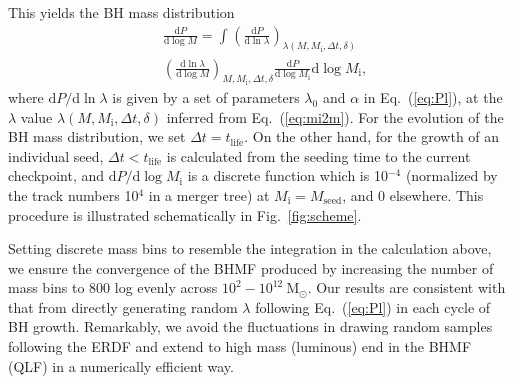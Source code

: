 \documentclass[nolinenumbers,preprint2,tighten]{aastex631}
\newcommand{\Msun}{\mathrm{M_\odot}}
\newcommand{\tlife}{t_\mathrm{life}}
\newcommand{\D}{\mathrm{d}}
\begin{document}
\begin{CJK*}{UTF8}{gbsn}
This yields the BH mass distribution 
\begin{align}
  \label{eq:dpdm}
  & \frac{\D P}{\D \log M} = \int_{}^{} 
   \left(\frac{\D P}{\D \ln \lambda}\right)_{\lambda(M, M_\mathrm{i},\Delta t, \delta)} \nonumber \\
  & \left(\frac{\D \ln \lambda}{\D \log M} \right)_{M, M_\mathrm{i},\Delta t, \delta}
  \frac{\D P}{\D \log M_\mathrm{i}} \D\log M_\mathrm{i},
\end{align}
where ${\D P}/{\D \ln\lambda}$ is given by a set of parameters $\lambda_0$ and $\alpha$ in Eq.~(\ref{eq:Pl}), 
at the $\lambda$ value $\lambda\left(M, M_\mathrm{i},\Delta t, \delta\right)$ inferred from Eq.~(\ref{eq:mi2m}).
For the evolution of the BH mass distribution, we set $\Delta t=\tlife$.
On the other hand, for the growth of an individual seed, 
$\Delta t < \tlife$ is calculated from the seeding time to the current checkpoint,
and $ \D P/\D \log M_\mathrm{i}$ is a discrete function which is 10$^{-4}$ 
(normalized by the track numbers 10$^4$ in a merger tree) at $M_\mathrm{i} = M_\mathrm{seed}$, 
and 0 elsewhere.
This procedure is illustrated schematically in Fig.~\ref{fig:scheme}. 


Setting discrete mass bins to resemble the integration in the calculation above, 
we ensure the convergence of the BHMF produced by increasing the number of mass bins to 800 log evenly across $10^2-10^{12}~\Msun$. 
Our results are consistent with that from directly generating random $\lambda$ 
following Eq.~(\ref{eq:Pl}) in each cycle of BH growth. 
Remarkably, we avoid the fluctuations in drawing random samples following the ERDF 
and extend to high mass (luminous) end in the BHMF (QLF) in a numerically efficient way.


\vspace{2mm}

\end{CJK*}
\end{document}
